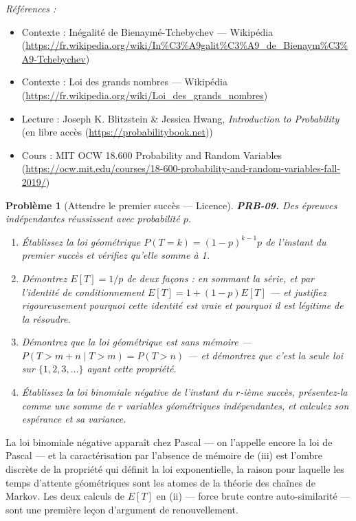 \documentclass[11pt]{article}
\newtheorem{problem}{Problème}
\newenvironment{refs}{\par\small\noindent\emph{Références :}\begin{itemize}\setlength\itemsep{0pt}}{\end{itemize}\normalsize}
\begin{document}
\begin{refs}
\item Contexte : Inégalité de Bienaymé-Tchebychev --- Wikipédia (\url{https://fr.wikipedia.org/wiki/In%C3%A9galit%C3%A9_de_Bienaym%C3%A9-Tchebychev})
\item Contexte : Loi des grands nombres --- Wikipédia (\url{https://fr.wikipedia.org/wiki/Loi_des_grands_nombres})
\item Lecture : Joseph K. Blitzstein \& Jessica Hwang, \textit{Introduction to Probability} (en libre accès (\url{https://probabilitybook.net}))
\item Cours : MIT OCW 18.600 Probability and Random Variables (\url{https://ocw.mit.edu/courses/18-600-probability-and-random-variables-fall-2019/})
\end{refs}

\bigskip

\begin{problem}[{Attendre le premier succès --- Licence}]
\textbf{PRB-09.} Des épreuves indépendantes réussissent avec probabilité $ p $.
\begin{enumerate}
\item[(i)] Établissez la loi géométrique $ P(T = k) = (1-p)^{k-1}p $ de l'instant du premier succès et
vérifiez qu'elle somme à 1.
\item[(ii)] Démontrez $ E[T] = 1/p $ de deux façons : en sommant la série, et par l'identité de
conditionnement $ E[T] = 1 + (1-p)E[T] $ --- et justifiez rigoureusement pourquoi cette identité
est vraie et pourquoi il est légitime de la résoudre.
\item[(iii)] Démontrez que la loi géométrique est sans mémoire ---
$ P(T > m+n \mid T > m) = P(T > n) $ --- et démontrez que c'est la \textit{seule} loi sur
$ \{1,2,3,\dots\} $ ayant cette propriété.
\item[(iv)] Établissez la loi binomiale négative de l'instant du $ r $-ième succès, présentez-la comme
une somme de $ r $ variables géométriques indépendantes, et calculez son espérance et sa
variance.
\end{enumerate}

\end{problem}

\noindent La loi binomiale négative apparaît chez Pascal --- on l'appelle encore la loi de
Pascal --- et la caractérisation par l'absence de mémoire de (iii) est l'ombre discrète de la
propriété qui définit la loi exponentielle, la raison pour laquelle les temps d'attente
géométriques sont les atomes de la théorie des chaînes de Markov. Les deux calculs de $ E[T] $
en (ii) --- force brute contre auto-similarité --- sont une première leçon d'argument de
renouvellement.
\end{document}
